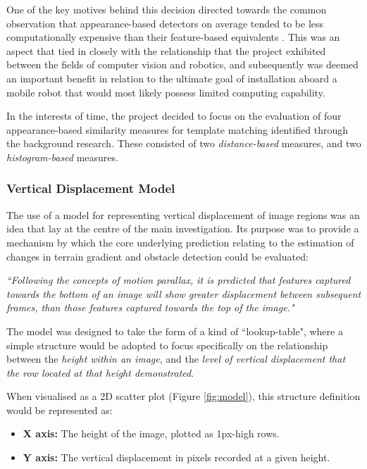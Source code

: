 One of the key motives behind this decision directed towards the common observation that appearance-based detectors on average tended to be less computationally expensive than their feature-based equivalents \cite{wyeth}. This was an aspect that tied in closely with the relationship that the project exhibited between the fields of computer vision and robotics, and subsequently was deemed an important benefit in relation to the ultimate goal of installation aboard a mobile robot that would most likely possess limited computing capability.

In the interests of time, the project decided to focus on the evaluation of four appearance-based similarity measures for template matching identified through the background research. These consisted of two \textit{distance-based} measures, and two \textit{histogram-based} measures.

\subsubsection{Vertical Displacement Model}
\label{hypo-model}

The use of a model for representing vertical displacement of image regions was an idea that lay at the centre of the main investigation. Its purpose was to provide a mechanism by which the core underlying prediction relating to the estimation of changes in terrain gradient and obstacle detection could be evaluated:
	
	\indent \textit{``Following the concepts of motion parallax, it is predicted that features captured towards the bottom of an image will show greater displacement between subsequent frames, than those features captured towards the top of the image."}
	
The model was designed to take the form of a kind of ``lookup-table", where a simple structure would be adopted to focus specifically on the relationship between the \textit{height within an image}, and the \textit{level of vertical displacement that the row located at that height demonstrated}. 
 
 When visualised as a 2D scatter plot (Figure \ref{fig:model}), this structure definition would be represented as:
	
	\begin{itemize}
		\item \textbf{X axis:} The height of the image, plotted as 1px-high rows.
		\item \textbf{Y axis:} The vertical displacement in pixels recorded at a given height.
	\end{itemize}
	
